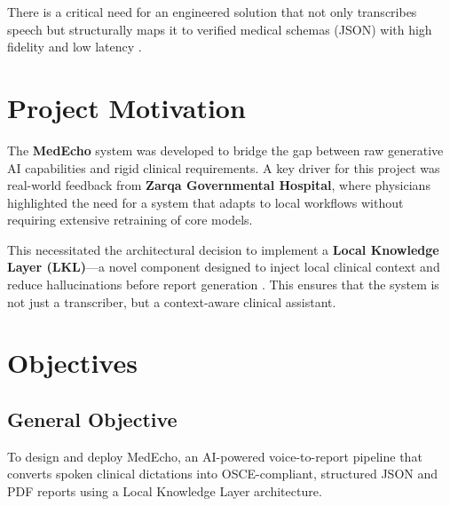 There is a critical need for an engineered solution that not only transcribes speech but structurally maps it to verified medical schemas (JSON) with high fidelity and low latency \cite{json2017standard}.

\section{Project Motivation}\label{sec:intro:motivation}

The \textbf{MedEcho} system was developed to bridge the gap between raw generative AI capabilities and rigid clinical requirements. A key driver for this project was real-world feedback from \textbf{Zarqa Governmental Hospital}, where physicians highlighted the need for a system that adapts to local workflows without requiring extensive retraining of core models.

This necessitated the architectural decision to implement a \textbf{Local Knowledge Layer (LKL)}—a novel component designed to inject local clinical context and reduce hallucinations before report generation \cite{lewis2020retrieval}. This ensures that the system is not just a transcriber, but a context-aware clinical assistant.

\section{Objectives}\label{sec:intro:objectives}

\subsection*{General Objective}
To design and deploy MedEcho, an AI-powered voice-to-report pipeline that converts spoken clinical dictations into OSCE-compliant, structured JSON and PDF reports using a Local Knowledge Layer architecture.

